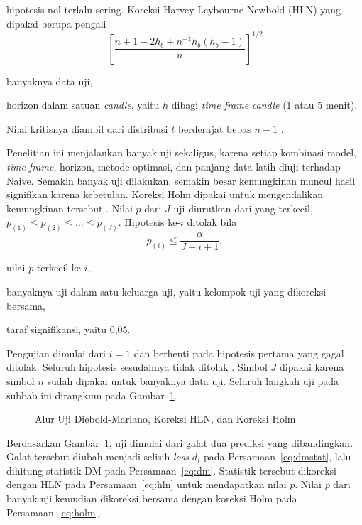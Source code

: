 hipotesis nol terlalu sering. Koreksi Harvey-Leybourne-Newbold (HLN) yang dipakai berupa pengali
\begin{equation}
  \left[\frac{n + 1 - 2h_b + n^{-1}h_b(h_b-1)}{n}\right]^{1/2}
  \label{eq:hln}
\end{equation}
\begin{keterangan}
  \item[$n$] banyaknya data uji,
  \item[$h_b$] horizon dalam satuan \textit{candle}, yaitu $h$ dibagi
    \textit{time frame} \textit{candle} (1 atau 5 menit).
\end{keterangan}
Nilai kritisnya diambil dari distribusi $t$ berderajat bebas $n-1$
\cite{harvey1997}.

Penelitian ini menjalankan banyak uji sekaligus, karena setiap kombinasi
model, \textit{time frame}, horizon, metode optimasi, dan panjang data latih
diuji terhadap Naive.
Semakin banyak uji dilakukan, semakin besar kemungkinan muncul hasil signifikan
karena kebetulan. Koreksi Holm dipakai untuk mengendalikan kemungkinan tersebut
\cite{holm1979}. Nilai $p$ dari $J$ uji diurutkan dari yang terkecil,
$p_{(1)} \le p_{(2)} \le \dots \le p_{(J)}$. Hipotesis ke-$i$ ditolak bila
\begin{equation}
  p_{(i)} \le \frac{\alpha}{J - i + 1},
    \label{eq:holm}
\end{equation}
\begin{keterangan}
  \item[$p_{(i)}$] nilai $p$ terkecil ke-$i$,
  \item[$J$] banyaknya uji dalam satu keluarga uji, yaitu kelompok uji yang dikoreksi bersama,
  \item[$\alpha$] taraf signifikansi, yaitu 0,05.
\end{keterangan}
Pengujian dimulai dari $i = 1$ dan berhenti pada hipotesis pertama yang gagal
ditolak. Seluruh hipotesis sesudahnya tidak ditolak \cite{holm1979}.
Simbol $J$ dipakai karena simbol $n$ sudah dipakai untuk banyaknya data uji.
Seluruh langkah uji pada subbab ini dirangkum pada Gambar~\ref{fig:alurdm}.

\begin{figure}[!htbp]
  \centering
  \caption{Alur Uji Diebold-Mariano, Koreksi HLN, dan Koreksi Holm}
  \label{fig:alurdm}
\end{figure}

Berdasarkan Gambar~\ref{fig:alurdm}, uji dimulai dari galat dua prediksi
yang dibandingkan. Galat tersebut diubah menjadi selisih \textit{loss} $d_t$
pada Persamaan~\eqref{eq:dmstat}, lalu dihitung statistik DM pada
Persamaan~\eqref{eq:dm}. Statistik tersebut
dikoreksi dengan HLN pada Persamaan~\eqref{eq:hln} untuk mendapatkan nilai $p$.
Nilai $p$ dari banyak uji kemudian dikoreksi bersama dengan koreksi Holm pada
Persamaan~\eqref{eq:holm}.


